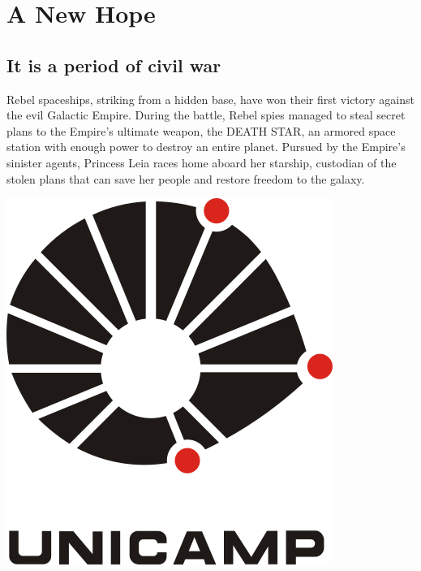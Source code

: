 \chapter{A New Hope}
\section{It is a period of civil war}
Rebel spaceships, striking from a hidden base, have won 
their first victory against the evil Galactic Empire.  
During the battle, Rebel spies managed to steal secret 
plans to the Empire's ultimate weapon, the DEATH STAR, 
an armored space station with enough power to destroy 
an entire planet. Pursued by the Empire's sinister 
agents, Princess Leia races home aboard her starship, 
custodian of the stolen plans that can save her people 
and restore freedom to the galaxy.

\lipsum[1-3]
\cite{CHAUDHURI_2014,MATSUI_1986,MROWCZYNSKI_1998}

\begin{center}
\includegraphics[width=.35\textwidth]{Images/unicamp.png}
\end{center}

\lipsum[4-10]
